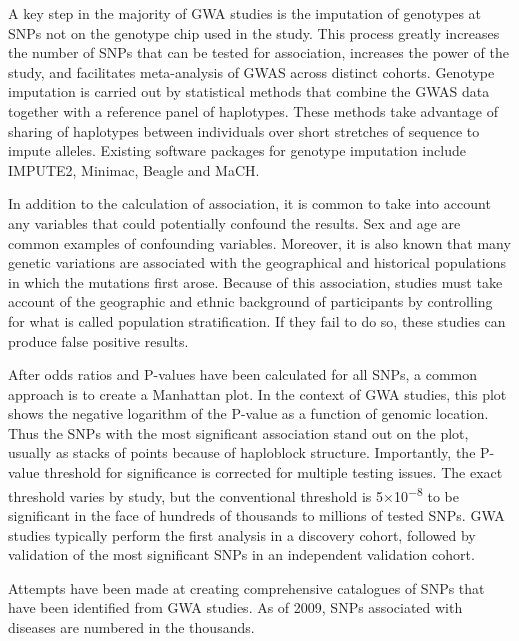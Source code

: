A key step in the majority of GWA studies is the imputation of genotypes at SNPs not on the genotype chip used in the study. This process greatly increases the number of SNPs that can be tested for association, increases the power of the study, and facilitates meta-analysis of GWAS across distinct cohorts. Genotype imputation is carried out by statistical methods that combine the GWAS data together with a reference panel of haplotypes. These methods take advantage of sharing of haplotypes between individuals over short stretches of sequence to impute alleles. Existing software packages for genotype imputation include IMPUTE2, Minimac, Beagle and MaCH.

In addition to the calculation of association, it is common to take into account any variables that could potentially confound the results. Sex and age are common examples of confounding variables. Moreover, it is also known that many genetic variations are associated with the geographical and historical populations in which the mutations first arose. Because of this association, studies must take account of the geographic and ethnic background of participants by controlling for what is called population stratification. If they fail to do so, these studies can produce false positive results.

After odds ratios and P-values have been calculated for all SNPs, a common approach is to create a Manhattan plot. In the context of GWA studies, this plot shows the negative logarithm of the P-value as a function of genomic location. Thus the SNPs with the most significant association stand out on the plot, usually as stacks of points because of haploblock structure. Importantly, the P-value threshold for significance is corrected for multiple testing issues. The exact threshold varies by study, but the conventional threshold is 5×10\textsuperscript{−8} to be significant in the face of hundreds of thousands to millions of tested SNPs. GWA studies typically perform the first analysis in a discovery cohort, followed by validation of the most significant SNPs in an independent validation cohort.

Attempts have been made at creating comprehensive catalogues of SNPs that have been identified from GWA studies. As of 2009, SNPs associated with diseases are numbered in the thousands.


